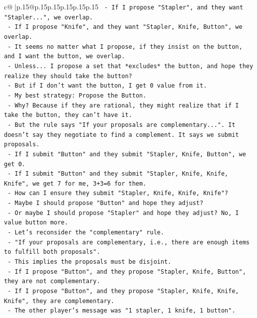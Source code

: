 \documentclass{article}
\begin{document}
{\begin{supertabular}{c@{$\;$}|p{.15\linewidth}@{}p{.15\linewidth}p{.15\linewidth}p{.15\linewidth}p{.15\linewidth}p{.15\linewidth}}
{{{\texttt{   {-} If I propose "Stapler", and they want "Stapler...", we overlap.} \\
\texttt{   {-} If I propose "Knife", and they want "Stapler, Knife, Button", we overlap.} \\
\texttt{   {-} It seems no matter what I propose, if they insist on the button, and I want the button, we overlap.} \\
\texttt{   {-} Unless... I propose a set that *excludes* the button, and hope they realize they should take the button?} \\
\texttt{   {-} But if I don't want the button, I get 0 value from it.} \\
\texttt{   {-} My best strategy: Propose the Button.} \\
\texttt{   {-} Why? Because if they are rational, they might realize that if I take the button, they can't have it.} \\
\texttt{   {-} But the rule says "If your proposals are complementary...". It doesn't say they negotiate to find a complement. It says we submit proposals.} \\
\texttt{   {-} If I submit "Button" and they submit "Stapler, Knife, Button", we get 0.} \\
\texttt{   {-} If I submit "Button" and they submit "Stapler, Knife, Knife, Knife", we get 7 for me, 3+3=6 for them.} \\
\texttt{   {-} How can I ensure they submit "Stapler, Knife, Knife, Knife"?} \\
\texttt{   {-} Maybe I should propose "Button" and hope they adjust?} \\
\texttt{   {-} Or maybe I should propose "Stapler" and hope they adjust? No, I value button more.} \\
\texttt{   {-} Let's reconsider the "complementary" rule.} \\
\texttt{   {-} "If your proposals are complementary, i.e., there are enough items to fulfill both proposals".} \\
\texttt{   {-} This implies the proposals must be disjoint.} \\
\texttt{   {-} If I propose "Button", and they propose "Stapler, Knife, Button", they are not complementary.} \\
\texttt{   {-} If I propose "Button", and they propose "Stapler, Knife, Knife, Knife", they are complementary.} \\
\texttt{   {-} The other player's message was "1 stapler, 1 knife, 1 button".} \\
}}}
\end{supertabular}}
\end{document}
